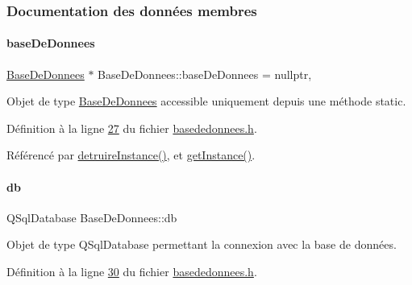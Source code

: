 \subsubsection{Documentation des données membres}
\mbox{\label{class_base_de_donnees_a822ba0b7cf85b1e48ced8efd3d65e266}} 
\paragraph{\texorpdfstring{base\+De\+Donnees}{baseDeDonnees}}
{\footnotesize\ttfamily \hyperlink{class_base_de_donnees}{Base\+De\+Donnees} $\ast$ Base\+De\+Donnees\+::base\+De\+Donnees = nullptr\hspace{0.3cm}{\ttfamily [static]}, {\ttfamily [private]}}



Objet de type \hyperlink{class_base_de_donnees}{Base\+De\+Donnees} accessible uniquement depuis une méthode static. 



Définition à la ligne \hyperlink{basededonnees_8h_source_l00027}{27} du fichier \hyperlink{basededonnees_8h_source}{basededonnees.\+h}.



Référencé par \hyperlink{basededonnees_8cpp_source_l00044}{detruire\+Instance()}, et \hyperlink{basededonnees_8cpp_source_l00031}{get\+Instance()}.

\mbox{\label{class_base_de_donnees_a3e738dcf443370c46a541677ab619f06}} 
\paragraph{\texorpdfstring{db}{db}}
{\footnotesize\ttfamily Q\+Sql\+Database Base\+De\+Donnees\+::db\hspace{0.3cm}{\ttfamily [private]}}



Objet de type Q\+Sql\+Database permettant la connexion avec la base de données. 



Définition à la ligne \hyperlink{basededonnees_8h_source_l00030}{30} du fichier \hyperlink{basededonnees_8h_source}{basededonnees.\+h}.



